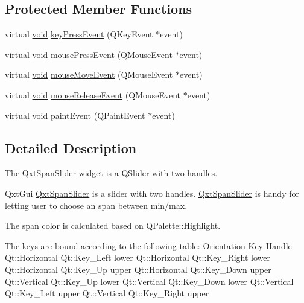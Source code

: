 \subsection*{Protected Member Functions}
\begin{DoxyCompactItemize}
\item 
virtual \hyperlink{group___u_a_v_objects_plugin_ga444cf2ff3f0ecbe028adce838d373f5c}{void} \hyperlink{class_qxt_span_slider_ae4216623cf166b6fcf8c2af00134b935}{key\-Press\-Event} (Q\-Key\-Event $\ast$event)
\item 
virtual \hyperlink{group___u_a_v_objects_plugin_ga444cf2ff3f0ecbe028adce838d373f5c}{void} \hyperlink{class_qxt_span_slider_a450b7b6562de6f0d8d03d13a32d19740}{mouse\-Press\-Event} (Q\-Mouse\-Event $\ast$event)
\item 
virtual \hyperlink{group___u_a_v_objects_plugin_ga444cf2ff3f0ecbe028adce838d373f5c}{void} \hyperlink{class_qxt_span_slider_ac745d46c6dd04411d8b7f59f40a59b28}{mouse\-Move\-Event} (Q\-Mouse\-Event $\ast$event)
\item 
virtual \hyperlink{group___u_a_v_objects_plugin_ga444cf2ff3f0ecbe028adce838d373f5c}{void} \hyperlink{class_qxt_span_slider_a3f837b2ca5336b102c51f2d40596936c}{mouse\-Release\-Event} (Q\-Mouse\-Event $\ast$event)
\item 
virtual \hyperlink{group___u_a_v_objects_plugin_ga444cf2ff3f0ecbe028adce838d373f5c}{void} \hyperlink{class_qxt_span_slider_a043e2ada05568e72d1e08593a36dd7a8}{paint\-Event} (Q\-Paint\-Event $\ast$event)
\end{DoxyCompactItemize}


\subsection{Detailed Description}
The \hyperlink{class_qxt_span_slider}{Qxt\-Span\-Slider} widget is a Q\-Slider with two handles. 

Qxt\-Gui \hyperlink{class_qxt_span_slider}{Qxt\-Span\-Slider} is a slider with two handles. \hyperlink{class_qxt_span_slider}{Qxt\-Span\-Slider} is handy for letting user to choose an span between min/max.

The span color is calculated based on Q\-Palette\-::\-Highlight.

The keys are bound according to the following table\-:    Orientation  Key  Handle   Qt\-::\-Horizontal  Qt\-::\-Key\-\_\-\-Left  lower   Qt\-::\-Horizontal  Qt\-::\-Key\-\_\-\-Right  lower   Qt\-::\-Horizontal  Qt\-::\-Key\-\_\-\-Up  upper   Qt\-::\-Horizontal  Qt\-::\-Key\-\_\-\-Down  upper   Qt\-::\-Vertical  Qt\-::\-Key\-\_\-\-Up  lower   Qt\-::\-Vertical  Qt\-::\-Key\-\_\-\-Down  lower   Qt\-::\-Vertical  Qt\-::\-Key\-\_\-\-Left  upper   Qt\-::\-Vertical  Qt\-::\-Key\-\_\-\-Right  upper 

